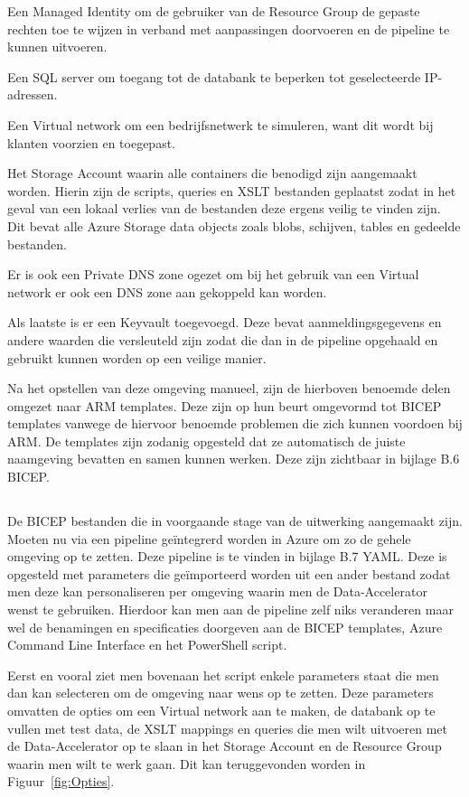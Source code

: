Een Managed Identity om de gebruiker van de Resource Group de gepaste rechten toe te wijzen in verband met aanpassingen doorvoeren en de pipeline te kunnen uitvoeren.

Een SQL server om toegang tot de databank te beperken tot geselecteerde IP-adressen.

Een Virtual network om een bedrijfsnetwerk te simuleren, want dit wordt bij klanten voorzien en toegepast.

Het Storage Account waarin alle containers die benodigd zijn aangemaakt worden. Hierin zijn de scripts, queries en XSLT bestanden geplaatst zodat in het geval van een lokaal verlies van de bestanden deze ergens veilig te vinden zijn. Dit bevat alle Azure Storage data objects zoals blobs, schijven, tables en gedeelde bestanden.

Er is ook een Private DNS zone ogezet om bij het gebruik van een Virtual network er ook een DNS zone aan gekoppeld kan worden.

Als laatste is er een Keyvault toegevoegd. Deze bevat aanmeldingsgegevens en andere waarden die versleuteld zijn zodat die dan in de pipeline opgehaald en gebruikt kunnen worden op een veilige manier.

Na het opstellen van deze omgeving manueel, zijn de hierboven benoemde delen omgezet naar ARM templates. Deze zijn op hun beurt omgevormd tot BICEP templates vanwege de hiervoor benoemde problemen die zich kunnen voordoen bij ARM. De templates zijn zodanig opgesteld dat ze automatisch de juiste naamgeving bevatten en samen kunnen werken. Deze zijn zichtbaar in bijlage B.6 BICEP.

\subsection{}%
\label{sec:Pipeline}

De BICEP bestanden die in voorgaande stage van de uitwerking aangemaakt zijn. Moeten nu via een pipeline geïntegrerd worden in Azure om zo de gehele omgeving op te zetten. Deze pipeline is te vinden in bijlage B.7 YAML. Deze is opgesteld met parameters die geïmporteerd worden uit een ander bestand zodat men deze kan personaliseren per omgeving waarin men de Data-Accelerator wenst te gebruiken. Hierdoor kan men aan de pipeline zelf niks veranderen maar wel de benamingen en specificaties doorgeven aan de BICEP templates, Azure Command Line Interface en het PowerShell script.

Eerst en vooral ziet men bovenaan het script enkele parameters staat die men dan kan selecteren om de omgeving naar wens op te zetten. Deze parameters omvatten de opties om een Virtual network aan te maken, de databank op te vullen met test data, de XSLT mappings en queries die men wilt uitvoeren met de Data-Accelerator op te slaan in het Storage Account en de Resource Group waarin men wilt te werk gaan. Dit kan teruggevonden worden in Figuur~\ref{fig:Opties}.

